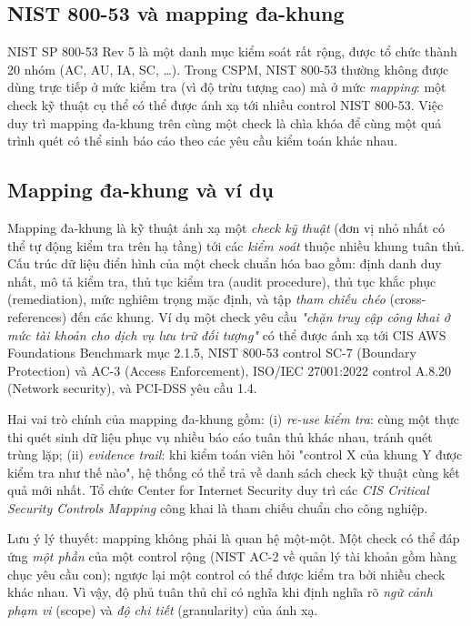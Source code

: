 \subsection{NIST 800-53 và mapping đa-khung}
\label{subsec:nist-800-53}

NIST SP 800-53 Rev 5 \cite{nist_800_53_r5} là một danh mục kiểm soát rất rộng, được tổ chức thành 20 nhóm (AC, AU, IA, SC, \dots). Trong CSPM, NIST 800-53 thường không được dùng trực tiếp ở mức kiểm tra (vì độ trừu tượng cao) mà ở mức \textit{mapping}: một check kỹ thuật cụ thể có thể được ánh xạ tới nhiều control NIST 800-53. Việc duy trì mapping đa-khung trên cùng một check là chìa khóa để cùng một quá trình quét có thể sinh báo cáo theo các yêu cầu kiểm toán khác nhau.

\subsection{Mapping đa-khung và ví dụ}
\label{subsec:multi-framework-mapping}

Mapping đa-khung là kỹ thuật ánh xạ một \textit{check kỹ thuật} (đơn vị nhỏ nhất có thể tự động kiểm tra trên hạ tầng) tới các \textit{kiểm soát} thuộc nhiều khung tuân thủ. Cấu trúc dữ liệu điển hình của một check chuẩn hóa bao gồm: định danh duy nhất, mô tả kiểm tra, thủ tục kiểm tra (audit procedure), thủ tục khắc phục (remediation), mức nghiêm trọng mặc định, và tập \textit{tham chiếu chéo} (cross-references) đến các khung. Ví dụ một check yêu cầu \textit{"chặn truy cập công khai ở mức tài khoản cho dịch vụ lưu trữ đối tượng"} có thể được ánh xạ tới CIS AWS Foundations Benchmark mục 2.1.5, NIST 800-53 control SC-7 (Boundary Protection) và AC-3 (Access Enforcement), ISO/IEC 27001:2022 control A.8.20 (Network security), và PCI-DSS yêu cầu 1.4.

Hai vai trò chính của mapping đa-khung gồm: (i) \textit{re-use kiểm tra}: cùng một thực thi quét sinh dữ liệu phục vụ nhiều báo cáo tuân thủ khác nhau, tránh quét trùng lặp; (ii) \textit{evidence trail}: khi kiểm toán viên hỏi "control X của khung Y được kiểm tra như thế nào", hệ thống có thể trả về danh sách check kỹ thuật cùng kết quả mới nhất. Tổ chức Center for Internet Security duy trì các \textit{CIS Critical Security Controls Mapping} công khai \cite{cis_controls_v8} là tham chiếu chuẩn cho công nghiệp.

Lưu ý lý thuyết: mapping không phải là quan hệ một-một. Một check có thể đáp ứng \textit{một phần} của một control rộng (NIST AC-2 về quản lý tài khoản gồm hàng chục yêu cầu con); ngược lại một control có thể được kiểm tra bởi nhiều check khác nhau. Vì vậy, độ phủ tuân thủ chỉ có nghĩa khi định nghĩa rõ \textit{ngữ cảnh phạm vi} (scope) và \textit{độ chi tiết} (granularity) của ánh xạ.

